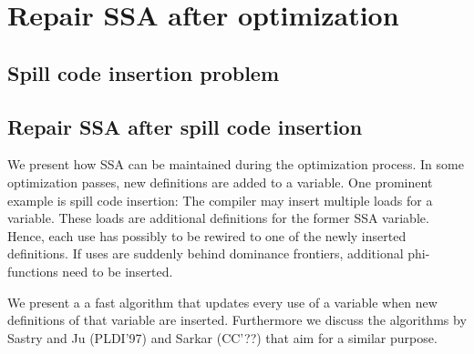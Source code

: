 \applynumberofpages\chapter{Repair SSA after optimization }

\section{Spill code insertion problem}
\section{Repair SSA after spill code insertion}
We present how SSA can be maintained during the optimization process. 
In some optimization passes, new definitions are added to a variable.
One prominent example is spill code insertion:
The compiler may insert multiple loads for a variable.
These loads are additional definitions for the former SSA variable.
Hence, each use has possibly to be rewired to one of the newly inserted definitions.
If uses are suddenly behind dominance frontiers, additional phi-functions need to be inserted.

We present a a fast algorithm that updates every use of a variable when new definitions of that variable are inserted.
Furthermore we discuss the algorithms by Sastry and Ju (PLDI'97) and Sarkar (CC'??) that aim for a similar purpose.

